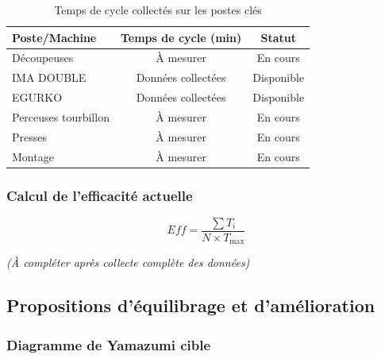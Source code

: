 \documentclass[12pt,a4paper]{article}
\begin{document}
\begin{center}
\begin{table}[H]
\centering
\caption{Temps de cycle collectés sur les postes clés}
\label{tab:ynion_tc}
\begin{tabular}{|l|c|c|}
\hline
\textbf{Poste/Machine} & \textbf{Temps de cycle (min)} & \textbf{Statut} \\ \hline
Découpeuses & À mesurer & En cours \\ \hline
IMA DOUBLE & Données collectées & Disponible \\ \hline
EGURKO & Données collectées & Disponible \\ \hline
Perceuses tourbillon & À mesurer & En cours \\ \hline
Presses & À mesurer & En cours \\ \hline
Montage & À mesurer & En cours \\ \hline
\end{tabular}
\end{table}

\subsubsection{Calcul de l'efficacité actuelle}

\[
Eff = \frac{\sum T_i}{N \times T_{\text{max}}}
\]

\textit{(À compléter après collecte complète des données)}

\subsection{Propositions d'équilibrage et d'amélioration}

\subsubsection{Diagramme de Yamazumi cible}

\begin{figure}[H]
\centering
{}
\end{figure}
\end{center}
\end{document}
